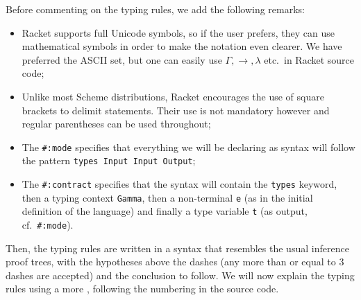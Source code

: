 \newpage

Before commenting on the typing rules, we add the following remarks:
\begin{itemize}
\item Racket supports full Unicode symbols, so if the user prefers, they
  can use mathematical symbols in order to make the notation even clearer.
  We have preferred the ASCII set, but one can easily use $ \Gamma, \to, \lambda $
  etc.\ in Racket source code;
\item Unlike most Scheme distributions, Racket encourages the use of square
  brackets to delimit  statements. Their use is not mandatory
  however and regular parentheses can be used throughout;
\item The \texttt{\#:mode} specifies that everything we will be declaring
  as syntax will follow the pattern \texttt{types Input Input Output};
\item The \texttt{\#:contract} specifies that the syntax will contain the
  \texttt{types} keyword, then a typing context \texttt{Gamma}, then a
  non-terminal \texttt{e} (as in the initial definition of the language) and
  finally a type variable \texttt{t} (as output, cf.\ \texttt{\#:mode}).
\end{itemize}

Then, the typing rules are written in a syntax that resembles the usual
inference proof trees, with the hypotheses above the dashes (any more than
or equal to 3 dashes are accepted) and the conclusion to follow.
We will now explain the typing rules using a more , following the numbering in the source code.

